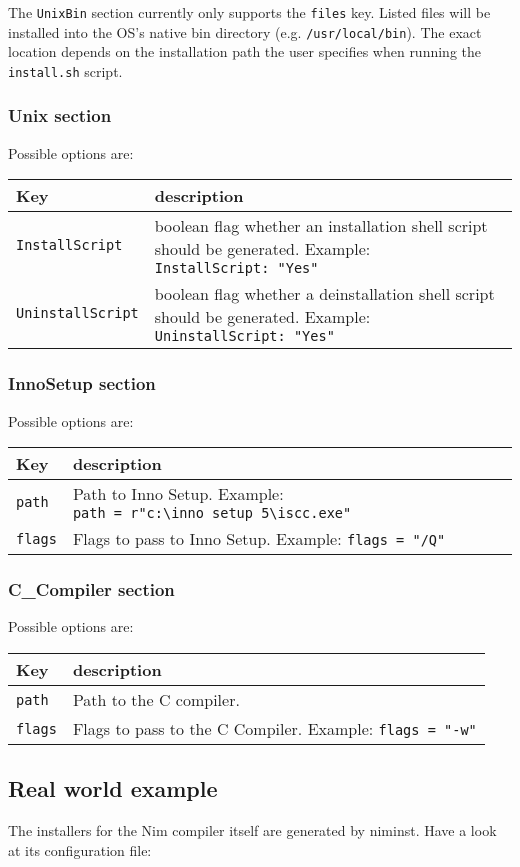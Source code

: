 The \texttt{UnixBin} section currently only supports the \texttt{files}
key. Listed files will be installed into the OS's native bin directory
(e.g. \texttt{/usr/local/bin}). The exact location depends on the
installation path the user specifies when running the
\texttt{install.sh} script.

\hypertarget{unix-section}{%
\subsubsection{Unix section}\label{unix-section}}

Possible options are:

\begin{longtable}[]{@{}ll@{}}
\toprule
Key & description\tabularnewline
\midrule
\endhead
\texttt{InstallScript} & boolean flag whether an installation shell
script should be generated. Example:
\texttt{InstallScript:\ "Yes"}\tabularnewline
\texttt{UninstallScript} & boolean flag whether a deinstallation shell
script should be generated. Example:
\texttt{UninstallScript:\ "Yes"}\tabularnewline
\bottomrule
\end{longtable}

\hypertarget{innosetup-section}{%
\subsubsection{InnoSetup section}\label{innosetup-section}}

Possible options are:

\begin{longtable}[]{@{}ll@{}}
\toprule
Key & description\tabularnewline
\midrule
\endhead
\texttt{path} & Path to Inno Setup. Example:
\texttt{path\ =\ r"c:\textbackslash{}inno\ setup\ 5\textbackslash{}iscc.exe"}\tabularnewline
\texttt{flags} & Flags to pass to Inno Setup. Example:
\texttt{flags\ =\ "/Q"}\tabularnewline
\bottomrule
\end{longtable}

\hypertarget{c_compiler-section}{%
\subsubsection{C\_Compiler section}\label{c_compiler-section}}

Possible options are:

\begin{longtable}[]{@{}ll@{}}
\toprule
Key & description\tabularnewline
\midrule
\endhead
\texttt{path} & Path to the C compiler.\tabularnewline
\texttt{flags} & Flags to pass to the C Compiler. Example:
\texttt{flags\ =\ "-w"}\tabularnewline
\bottomrule
\end{longtable}

\hypertarget{real-world-example}{%
\subsection{Real world example}\label{real-world-example}}

The installers for the Nim compiler itself are generated by niminst.
Have a look at its configuration file:
